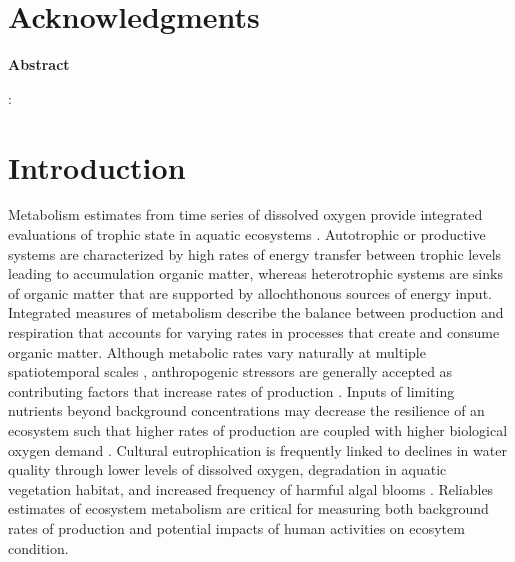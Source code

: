\documentclass[letterpaper,12pt,oneside]{article}\usepackage[]{graphicx}\usepackage[]{color}
\begin{document}
\raggedbottom
\raggedright
{}
\setlength{\parindent}{0.5in}
\renewcommand\refname{References \vspace{12pt}}



\section{Acknowledgments}

\centerline{{\bf Abstract}}
\begin{singlespace} \small
\noindent 

\normalsize
\end{singlespace}
:

\acresetall
\clearpage

\section{Introduction} \label{intro}

Metabolism estimates from time series of dissolved oxygen provide integrated evaluations of trophic state in aquatic ecosystems \citep{Kemp12,Needoba12}.  Autotrophic or productive systems are characterized by high rates of energy transfer between trophic levels leading to accumulation organic matter, whereas heterotrophic systems are sinks of organic matter that are supported by allochthonous sources of energy input.  Integrated measures of metabolism describe the balance between production and respiration that accounts for varying rates in processes that create and consume organic matter.  Although metabolic rates vary naturally at multiple spatiotemporal scales \citep{Ziegler98,Caffrey04,Russell07}, anthropogenic stressors are generally accepted as contributing factors that increase rates of production \citep{Diaz08}.  Inputs of limiting nutrients beyond background concentrations may decrease the resilience of an ecosystem such that higher rates of production are coupled with higher biological oxygen demand \citep{Yin04,Kemp09}.  Cultural eutrophication is frequently linked to declines in water quality through lower levels of dissolved oxygen, degradation in aquatic vegetation habitat, and increased frequency of harmful algal blooms \citep{Cloern96,Short96,Rabalais02}.  Reliables estimates of ecosystem metabolism are critical for measuring both background rates of production and potential impacts of human activities on ecosytem condition.     
\end{document}
